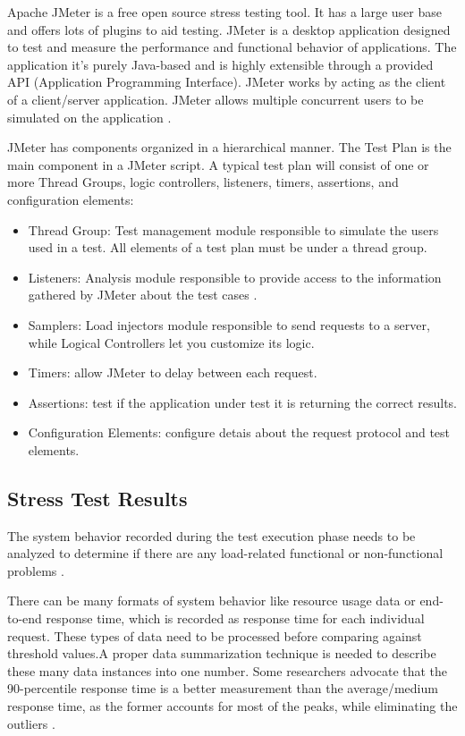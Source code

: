\documentclass[review]{elsarticle}
\begin{document}
Apache JMeter is a free open source stress testing tool.  It has a large user base and offers lots of plugins to aid testing. JMeter is a desktop application designed to test and measure the performance and functional behavior of applications. The application it's purely Java-based and is highly extensible through a provided API (Application Programming Interface). JMeter works by acting as the client of a client/server application. JMeter allows multiple concurrent users to be simulated on the application \cite{Halili2008} \cite{Erinle2013}. 

JMeter has components organized  in a hierarchical manner. The Test Plan is the main component in a JMeter script. A typical test plan will consist of one or more Thread Groups, logic controllers, listeners, timers, assertions, and configuration elements:

\begin{itemize}
\item Thread Group: Test management module responsible to simulate the users used in a test. All elements of a test plan must be under a thread group.
\item Listeners: Analysis module responsible to provide access to the information gathered by JMeter about the test cases .
\item Samplers: Load injectors module responsible to send requests to a server, while Logical Controllers let you customize its logic.
\item Timers: allow JMeter to delay between each request.
\item Assertions: test if the application under test it is returning the correct results.
\item Configuration Elements: configure detais about the request protocol and test elements.
\end{itemize}


\subsection{Stress Test Results}

The system behavior recorded during the test execution phase needs to be analyzed to determine if there are any load-related functional or non-functional problems \cite{Jiang2010}.

There can be many formats of system behavior like resource usage data or end-to-end response time, which is recorded as response time for each individual request. These types of data need to be processed before comparing against threshold values.A proper data summarization technique is needed to describe these many data instances into one number. Some researchers advocate that the 90-percentile response time is a better measurement than the average/medium response time, as the former accounts for most of the peaks, while eliminating the outliers \cite{Jiang2010}.
\end{document}
